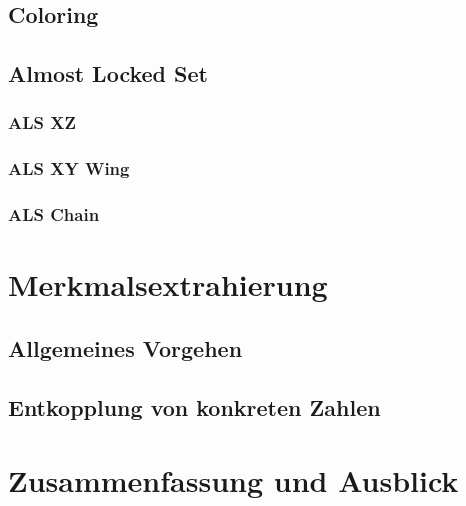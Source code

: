 \documentclass[accentcolor=tud6b,11pt,paper=a4]{tudreport}
\begin{document}
\newpage
\section{Coloring}

\newpage
\section{Almost Locked Set}

\newpage
\subsection{ALS XZ}

\newpage
\subsection{ALS XY Wing}

\newpage
\subsection{ALS Chain}


\chapter{Merkmalsextrahierung}
\section{Allgemeines Vorgehen}
\section{Entkopplung von konkreten Zahlen}

\chapter{Zusammenfassung und Ausblick}
\end{document}
